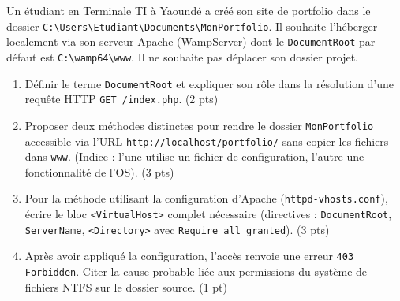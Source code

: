 \documentclass[11pt]{article}
\begin{document}
\begin{exercice}
Un étudiant en Terminale TI à Yaoundé a créé son site de portfolio dans le dossier \texttt{C:\textbackslash Users\textbackslash Etudiant\textbackslash Documents\textbackslash MonPortfolio}. Il souhaite l'héberger localement via son serveur Apache (WampServer) dont le \texttt{DocumentRoot} par défaut est \texttt{C:\textbackslash wamp64\textbackslash www}. Il ne souhaite pas déplacer son dossier projet.

\begin{enumerate}
    \item Définir le terme \texttt{DocumentRoot} et expliquer son rôle dans la résolution d'une requête HTTP \texttt{GET /index.php}. (2 pts)
    \item Proposer deux méthodes distinctes pour rendre le dossier \texttt{MonPortfolio} accessible via l'URL \texttt{http://localhost/portfolio/} sans copier les fichiers dans \texttt{www}. (Indice : l'une utilise un fichier de configuration, l'autre une fonctionnalité de l'OS). (3 pts)
    \item Pour la méthode utilisant la configuration d'Apache (\texttt{httpd-vhosts.conf}), écrire le bloc \texttt{<VirtualHost>} complet nécessaire (directives : \texttt{DocumentRoot}, \texttt{ServerName}, \texttt{<Directory>} avec \texttt{Require all granted}). (3 pts)
    \item Après avoir appliqué la configuration, l'accès renvoie une erreur \texttt{403 Forbidden}. Citer la cause probable liée aux permissions du système de fichiers NTFS sur le dossier source. (1 pt)
\end{enumerate}
\end{exercice}
\end{document}
